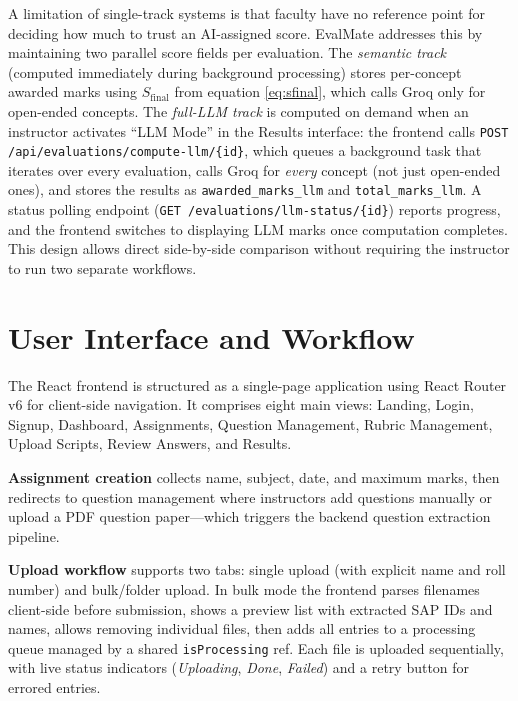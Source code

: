\documentclass[conference]{IEEEtran}
\begin{document}
A limitation of single-track systems is that faculty have no
reference point for deciding how much to trust an AI-assigned
score. EvalMate addresses this by maintaining two parallel score
fields per evaluation. The \textit{semantic track} (computed
immediately during background processing) stores per-concept
awarded marks using $S_{\mathrm{final}}$ from equation
\eqref{eq:sfinal}, which calls Groq only for open-ended concepts.
The \textit{full-LLM track} is computed on demand when an
instructor activates ``LLM Mode'' in the Results interface: the
frontend calls \texttt{POST /api/evaluations/compute-llm/\{id\}},
which queues a background task that iterates over every evaluation,
calls Groq for \textit{every} concept (not just open-ended ones),
and stores the results as \texttt{awarded\_marks\_llm} and
\texttt{total\_marks\_llm}. A status polling endpoint
(\texttt{GET /evaluations/llm-status/\{id\}}) reports progress,
and the frontend switches to displaying LLM marks once computation
completes. This design allows direct side-by-side comparison
without requiring the instructor to run two separate workflows.

\section{User Interface and Workflow}

The React frontend is structured as a single-page application using
React Router v6 for client-side navigation. It comprises eight
main views: Landing, Login, Signup, Dashboard, Assignments,
Question Management, Rubric Management, Upload Scripts,
Review Answers, and Results.

\textbf{Assignment creation} collects name, subject, date, and
maximum marks, then redirects to question management where
instructors add questions manually or upload a PDF question
paper---which triggers the backend question extraction pipeline.

\textbf{Upload workflow} supports two tabs: single upload (with
explicit name and roll number) and bulk/folder upload. In bulk
mode the frontend parses filenames client-side before submission,
shows a preview list with extracted SAP IDs and names, allows
removing individual files, then adds all entries to a processing
queue managed by a shared \texttt{isProcessing} ref. Each file
is uploaded sequentially, with live status indicators
(\textit{Uploading}, \textit{Done}, \textit{Failed}) and a retry
button for errored entries.
\end{document}
